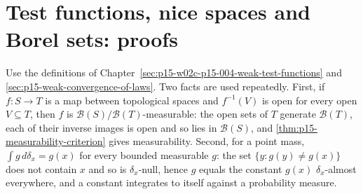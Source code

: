 \section{Test functions, nice spaces and Borel sets: proofs}
\label{sec:annex-p15-w02c-p15-004-weak-test-functions}

Use the definitions of
Chapter~\ref{sec:p15-w02c-p15-004-weak-test-functions} and
\cref{sec:p15-weak-convergence-of-laws}. Two facts are used repeatedly.
First, if \(f:S\to T\) is a map between topological spaces and
\(f^{-1}(V)\) is open for every open \(V\subseteq T\), then \(f\) is
\(\mathcal B(S)/\mathcal B(T)\)-measurable: the open sets of \(T\)
generate \(\mathcal B(T)\), each of their inverse images is open and so
lies in \(\mathcal B(S)\), and \cref{thm:p15-measurability-criterion}
gives measurability. Second, for a point mass,
\(\int g\,d\delta_x=g(x)\) for every bounded measurable \(g\): the set
\(\{y:g(y)\neq g(x)\}\) does not contain \(x\) and so is
\(\delta_x\)-null, hence \(g\) equals the constant \(g(x)\)
\(\delta_x\)-almost everywhere, and a constant integrates to itself
against a probability measure.


